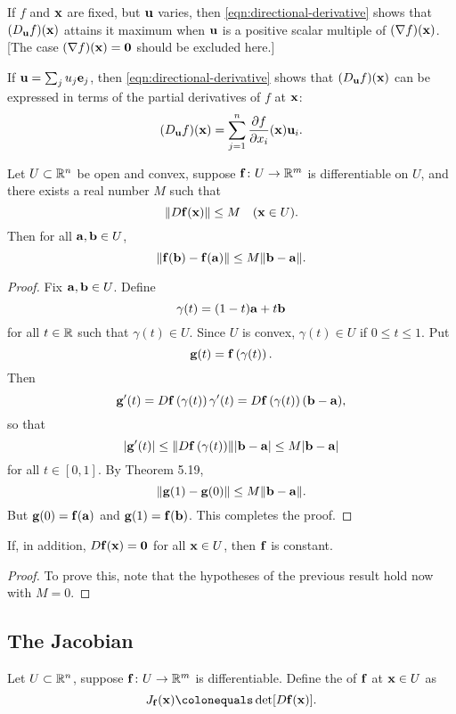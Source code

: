 If $f$ and $\vb{x}$ are fixed, but $\vb{u}$ varies, then \eqref{eqn:directional-derivative} shows that $(D_{\vb{u}}f)(\vb{x})$ attains it maximum when $\vb{u}$ is a positive scalar multiple of $(\nabla f)(\vb{x})$. [The case $(\nabla f)(\vb{x})=\vb{0}$ should be excluded here.]

If $\vb{u}=\sum_{j}u_j\vb{e}_j$, then \eqref{eqn:directional-derivative} shows that $(D_{\vb{u}}f)(\vb{x})$ can be expressed in terms of the partial derivatives of $f$ at $\vb{x}$:
\begin{equation}
(D_{\vb{u}}f)(\vb{x})=\sum_{j=1}^{n}\pdv{f}{x_i}(\vb{x})\vb{u}_i.
\end{equation}

\begin{proposition}
Let $U\subset\mathbb R^n$ be open and convex, suppose $\vb{f}\colon U\to\mathbb R^m$ is differentiable on $U$, and there exists a real number $M$ such that
\[\norm{D\vb{f}(\vb{x})}\le M\quad(\vb{x}\in U).\]
Then for all $\vb{a},\vb{b}\in U$,
\[\norm{\vb{f}(\vb{b})-\vb{f}(\vb{a})}\le M\norm{\vb{b}-\vb{a}}.\]
\end{proposition}

\begin{proof}
Fix $\vb{a},\vb{b}\in U$. Define
\[\gamma(t)=(1-t)\vb{a}+t\vb{b}\]
for all $t\in\mathbb R$ such that $\gamma(t)\in U$. 
Since $U$ is convex, $\gamma(t)\in U$ if $0\le t\le 1$. 
Put
\[\vb{g}(t)=\vb{f}\left(\gamma(t)\right).\]
Then
\[\vb{g}^\prime(t)=D\vb{f}\left(\gamma(t)\right)\gamma^\prime(t)=D\vb{f}\left(\gamma(t)\right)(\vb{b}-\vb{a}),\]
so that
\[|\vb{g}^\prime(t)|\le\norm{D\vb{f}\left(\gamma(t)\right)}|\vb{b}-\vb{a}|\le M|\vb{b}-\vb{a}|\]
for all $t\in[0,1]$. By Theorem 5.19,
\[\norm{\vb{g}(1)-\vb{g}(0)}\le M\norm{\vb{b}-\vb{a}}.\]
But $\vb{g}(0)=\vb{f}(\vb{a})$ and $\vb{g}(1)=\vb{f}(\vb{b})$. This completes the proof. 
\end{proof}

\begin{corollary}
If, in addition, $D\vb{f}(\vb{x})=\vb{0}$ for all $\vb{x}\in U$, then $\vb{f}$ is constant.
\end{corollary}

\begin{proof}
To prove this, note that the hypotheses of the previous result hold now with $M=0$.
\end{proof}

\subsection{The Jacobian}
\begin{definition}[Jacobian]
Let $U\subset\mathbb R^n$, suppose $\vb{f}\colon U\to\mathbb R^m$ is differentiable. Define the  of $\vb{f}$ at $\vb{x}\in U$ as
\[J_{\vb{f}}(\vb{x})\colonequals\det[D\vb{f}(\vb{x})].\]
\end{definition}

